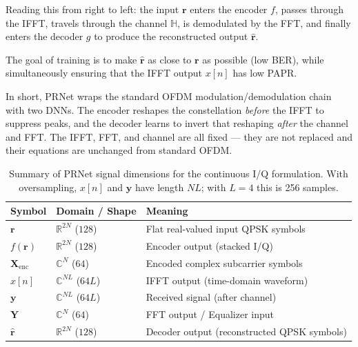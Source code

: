 Reading this from right to left: the input $\bm{r}$ enters the encoder $f$, passes through the IFFT, travels through the channel $\mathbb{H}$, is demodulated by the FFT, and finally enters the decoder $g$ to produce the reconstructed output $\hat{\bm{r}}$.

The goal of training is to make $\hat{\bm{r}}$ as close to $\bm{r}$ as possible (low BER), while simultaneously ensuring that the IFFT output $x[n]$ has low PAPR.

In short, PRNet wraps the standard OFDM modulation/demodulation chain with two DNNs.  The encoder reshapes the constellation \emph{before} the IFFT to suppress peaks, and the decoder learns to invert that reshaping \emph{after} the channel and FFT.  The IFFT, FFT, and channel are all fixed --- they are not replaced and their equations are unchanged from standard OFDM.

\begin{table}[H]
    \centering
    \caption{Summary of PRNet signal dimensions for the continuous I/Q formulation. With oversampling, $x[n]$ and $\bm{y}$ have length $NL$; with $L=4$ this is 256 samples.}
    \label{tab:prnet_shapes}
    \begin{tabular}{@{} l l l @{}}
        \toprule
        \textbf{Symbol}         & \textbf{Domain / Shape}                     & \textbf{Meaning} \\
        \midrule
        $\bm{r}$                & $\mathbb{R}^{2N}$ ($128$)
                                & Flat real-valued input QPSK symbols                            \\
        $f(\bm{r})$             & $\mathbb{R}^{2N}$ ($128$)
                                & Encoder output (stacked I/Q)                                   \\
        $\bm{X}_{\mathrm{enc}}$ & $\mathbb{C}^{N}$ ($64$)
                                & Encoded complex subcarrier symbols                             \\
        $x[n]$                  & $\mathbb{C}^{NL}$ ($64L$)
                                & IFFT output (time-domain waveform)                             \\
        $\bm{y}$                & $\mathbb{C}^{NL}$ ($64L$)
                                & Received signal (after channel)                                \\
        $\bm{Y}$                & $\mathbb{C}^{N}$ ($64$)
                                & FFT output / Equalizer input                                   \\
        $\hat{\bm{r}}$          & $\mathbb{R}^{2N}$ ($128$)
                                & Decoder output (reconstructed QPSK symbols)                    \\
        \bottomrule
    \end{tabular}
\end{table}


